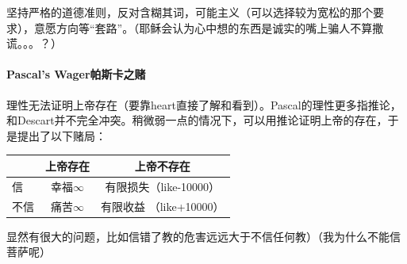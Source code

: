 坚持严格的道德准则，反对含糊其词，可能主义（可以选择较为宽松的那个要求），意愿方向等“套路”。（耶稣会认为心中想的东西是诚实的嘴上骗人不算撒谎。。。？）

\paragraph{Pascal’s Wager帕斯卡之赌}

理性无法证明上帝存在（要靠heart直接了解和看到）。Pascal的理性更多指推论，和Descart并不完全冲突。稍微弱一点的情况下，可以用推论证明上帝的存在，于是提出了以下赌局：

\begin{center}
\begin{tabular}{lcc}
\toprule
 & 上帝存在 & 上帝不存在 \\
\midrule
信 & 幸福$\infty$ & 有限损失（like-10000） \\
不信 & 痛苦$\infty$ & 有限收益 （like+10000）\\
\bottomrule
\end{tabular}
\end{center}

显然有很大的问题，比如信错了教的危害远远大于不信任何教）（我为什么不能信菩萨呢）

